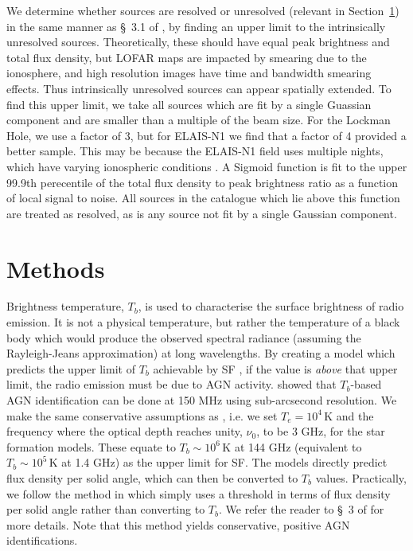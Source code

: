 \documentclass[usenatbib,fleqn,letters]{mnras}
\begin{document}
We determine whether sources are resolved or unresolved (relevant in Section~\ref{sec:methods}) in the same manner as \S~3.1 of \cite{shimwell_lofar_2019,shimwell_lofar_2022}, by finding an upper limit to the intrinsically unresolved sources. Theoretically, these should have equal peak brightness and total flux density, but LOFAR maps are impacted by smearing due to the ionosphere, and high resolution images have time and bandwidth smearing effects. Thus intrinsically unresolved sources can appear spatially extended. To find this upper limit, we take all sources which are fit by a single Guassian component and are smaller than a multiple of the beam size. For the Lockman Hole, we use a factor of 3, but for ELAIS-N1 we find that a factor of 4 provided a better sample. This may be because the ELAIS-N1 field uses multiple nights, which have varying ionospheric conditions \citep[see \S~2 in][]{de_jong_into_2024}. A Sigmoid function is fit to the upper 99.9th perecentile of the total flux density to peak brightness ratio as a function of local signal to noise. All sources in the catalogue which lie above this function are treated as resolved, as is any source not fit by a single Gaussian component. 

\section{Methods}
\label{sec:methods}
Brightness temperature, $T_b$, is used to characterise the surface brightness of radio emission. It is not a physical temperature, but rather the temperature of a black body  which would produce the observed spectral radiance (assuming the Rayleigh-Jeans approximation) at long wavelengths. By creating a model which predicts the upper limit of $T_b$ achievable by SF \citep[based on][]{condon_radio_1992}, if the value is \textit{above} that upper limit, the radio emission must be due to AGN activity.   showed that $T_b$-based AGN identification can be done at 150 MHz using sub-arcsecond resolution. We make the same conservative assumptions as , i.e. we set $T_e=10^4\,$K and the frequency where the optical depth reaches unity, $\nu_0$, to be 3 GHz, for the star formation models. These equate to $T_b\sim10^6\,$K at 144 GHz (equivalent to $T_b\sim10^5\,$K at 1.4 GHz) as the upper limit for SF. The models directly predict flux density per solid angle, which can then be converted to $T_b$ values. Practically, we follow the method in  which simply uses a threshold in terms of flux density per solid angle rather than converting to $T_b$. We refer the reader to \S~3 of  for more details. Note that this method yields conservative, positive AGN identifications. 
\end{document}
